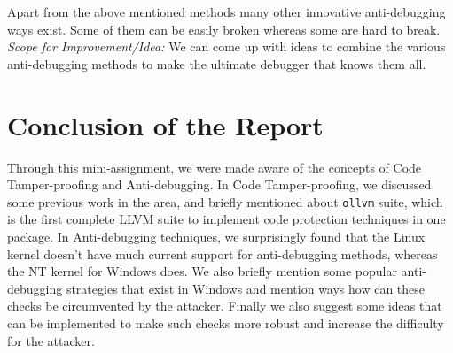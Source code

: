 \documentclass[11pt]{article}
\begin{document}
Apart from the above mentioned methods many other innovative anti-debugging ways exist. Some of them can be easily broken whereas some are hard to break.   
\textit{Scope for Improvement/Idea:} We can come up with ideas to combine the various anti-debugging methods to make the ultimate debugger that knows them all. 

\section{Conclusion of the Report}
Through this mini-assignment, we were made aware of the concepts of Code Tamper-proofing and Anti-debugging. In Code Tamper-proofing, we discussed some previous work in the area, and briefly mentioned about \texttt{ollvm} suite, which is the first complete LLVM suite to implement code protection techniques in one package. In Anti-debugging techniques, we surprisingly found that the Linux kernel doesn't have much current support for anti-debugging methods, whereas the NT kernel for Windows does. We also briefly mention some popular anti-debugging strategies that exist in Windows and mention ways how can these checks be circumvented by the attacker. Finally we also suggest some ideas that can be implemented to make such checks more robust and increase the difficulty for the attacker. 

\printbibliography
\end{document}
